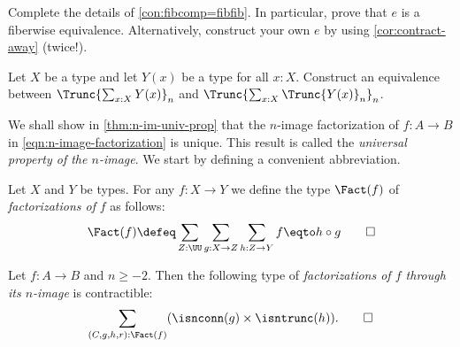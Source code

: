 \begin{xca}\label{xca:fibcomp=fibfib}
Complete the details of \cref{con:fibcomp=fibfib}.
In particular, prove that $e$ is a fiberwise equivalence.
Alternatively, construct your own $e$ by using \cref{cor:contract-away} (twice!).
\end{xca}

\begin{xca}\label{xca:pullout-base-type}
Let $X$ be a type and let $Y(x)$ be a type for all $x:X$.
Construct an equivalence between
$\Trunc{\sum_{x:X} Y(x)}_n$ and $\Trunc{\sum_{x:X} \Trunc{Y(x)}_n}_n$.
\end{xca}

We shall show in \cref{thm:n-im-univ-prop} that the $n$-image factorization
of $f:A\to B$ in \cref{eqn:n-image-factorization} is unique.
This result is called the \emph{universal property of the $n$-image}.
We start by defining a convenient abbreviation.

\begin{definition}\label{def:type-of-factorizations}
Let $X$ and $Y$ be types. For any $f:X\to Y$ we define
the type $\Fact(f)$ of \emph{factorizations of} $f$ as follows:
\[
\Fact(f)\defeq \sum_{Z:\UU}\sum_{g:X\to Z}\sum_{h:Z\to Y} f\eqto h\circ g
\qedhere
\]
\end{definition}

\begin{theorem}\label{thm:n-im-univ-prop}
Let $f:A\to B$ and $n\geq -2$. Then the following type
of \emph{factorizations of $f$ through its $n$-image} is contractible:
\[
  \sum_{(C,g,h,r):\Fact(f)} (\isnconn(g) \times \isntrunc(h)). \qedhere
  \]
\end{theorem}


